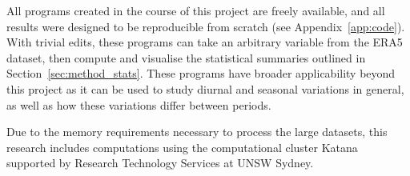 All programs created in the course of this project are freely available, and all results were designed to be reproducible from scratch (see Appendix~\ref{app:code}). With trivial edits, these programs can take an arbitrary variable from the ERA5 dataset, then compute and visualise the statistical summaries outlined in Section~\ref{sec:method_stats}. These programs have broader applicability beyond this project as it can be used to study diurnal and seasonal variations in general, as well as how these variations differ between periods.

Due to the memory requirements necessary to process the large datasets, this research includes computations using the computational cluster Katana supported by Research Technology Services at \ac{UNSW} Sydney.
